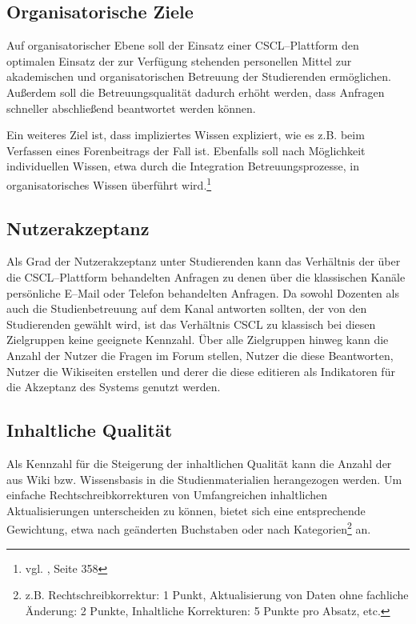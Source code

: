 \subsection{Organisatorische Ziele} %
\label{sub:organisatorische_ziele}
Auf organisatorischer Ebene soll der Einsatz einer CSCL–Plattform den optimalen Einsatz der zur Verfügung stehenden personellen Mittel zur akademischen und organisatorischen Betreuung der Studierenden ermöglichen. Außerdem soll die Betreuungsqualität dadurch erhöht werden, dass Anfragen schneller abschließend beantwortet werden können. 

Ein weiteres Ziel ist, dass impliziertes Wissen expliziert, wie es z.B. beim Verfassen eines Forenbeitrags der Fall ist. Ebenfalls soll nach Möglichkeit individuellen Wissen, etwa durch die Integration Betreuungsprozesse, in organisatorisches Wissen überführt wird.\footnote{vgl. \cite{lws}, Seite 358}

\subsection{Nutzerakzeptanz} %
\label{sub:nutzerakzeptanz}
Als Grad der Nutzerakzeptanz unter Studierenden kann das Verhältnis der über die CSCL–Plattform behandelten Anfragen zu denen über die klassischen Kanäle persönliche E–Mail oder Telefon behandelten Anfragen. Da sowohl Dozenten als auch die Studienbetreuung auf dem Kanal antworten sollten, der von den Studierenden gewählt wird, ist das Verhältnis CSCL zu klassisch bei diesen Zielgruppen keine geeignete Kennzahl. Über alle Zielgruppen hinweg kann die Anzahl der Nutzer die Fragen im Forum stellen, Nutzer die diese Beantworten, Nutzer die Wikiseiten erstellen und derer die diese editieren als Indikatoren für die Akzeptanz des Systems genutzt werden.

\subsection{Inhaltliche Qualität} %
\label{sub:inhaltliche_qualitat}
Als Kennzahl für die Steigerung der inhaltlichen Qualität kann die Anzahl der aus Wiki bzw. Wissensbasis in die Studienmaterialien herangezogen werden. Um einfache Rechtschreibkorrekturen von Umfangreichen inhaltlichen Aktualisierungen unterscheiden zu können, bietet sich eine entsprechende Gewichtung, etwa nach geänderten Buchstaben oder nach Kategorien\footnote{z.B. Rechtschreibkorrektur: 1 Punkt, Aktualisierung von Daten ohne fachliche Änderung: 2 Punkte, Inhaltliche Korrekturen: 5 Punkte pro Absatz, etc.} an.

